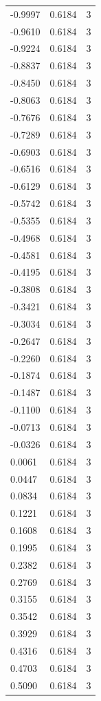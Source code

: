 \begin{longtable}{lrr}
  -0.9997 & 0.6184 & 3 \\
  -0.9610 & 0.6184 & 3 \\
  -0.9224 & 0.6184 & 3 \\
  -0.8837 & 0.6184 & 3 \\
  -0.8450 & 0.6184 & 3 \\
  -0.8063 & 0.6184 & 3 \\
  -0.7676 & 0.6184 & 3 \\
  -0.7289 & 0.6184 & 3 \\
  -0.6903 & 0.6184 & 3 \\
  -0.6516 & 0.6184 & 3 \\
  -0.6129 & 0.6184 & 3 \\
  -0.5742 & 0.6184 & 3 \\
  -0.5355 & 0.6184 & 3 \\
  -0.4968 & 0.6184 & 3 \\
  -0.4581 & 0.6184 & 3 \\
  -0.4195 & 0.6184 & 3 \\
  -0.3808 & 0.6184 & 3 \\
  -0.3421 & 0.6184 & 3 \\
  -0.3034 & 0.6184 & 3 \\
  -0.2647 & 0.6184 & 3 \\
  -0.2260 & 0.6184 & 3 \\
  -0.1874 & 0.6184 & 3 \\
  -0.1487 & 0.6184 & 3 \\
  -0.1100 & 0.6184 & 3 \\
  -0.0713 & 0.6184 & 3 \\
  -0.0326 & 0.6184 & 3 \\
  0.0061 & 0.6184 & 3 \\
  0.0447 & 0.6184 & 3 \\
  0.0834 & 0.6184 & 3 \\
  0.1221 & 0.6184 & 3 \\
  0.1608 & 0.6184 & 3 \\
  0.1995 & 0.6184 & 3 \\
  0.2382 & 0.6184 & 3 \\
  0.2769 & 0.6184 & 3 \\
  0.3155 & 0.6184 & 3 \\
  0.3542 & 0.6184 & 3 \\
  0.3929 & 0.6184 & 3 \\
  0.4316 & 0.6184 & 3 \\
  0.4703 & 0.6184 & 3 \\
  0.5090 & 0.6184 & 3 \\

\end{longtable}
